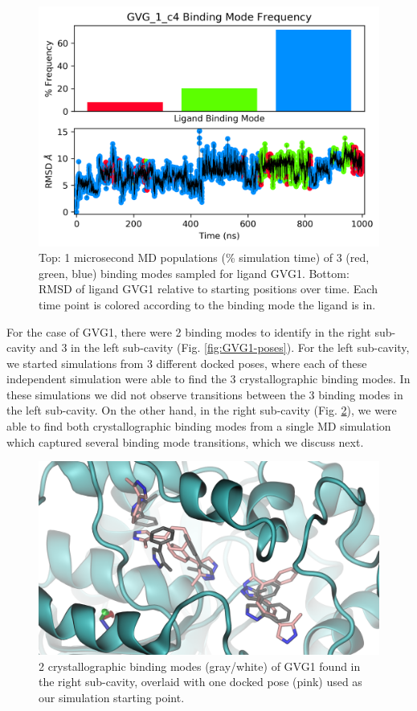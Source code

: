 \begin{figure}
    \centering
    \includegraphics[width=\linewidth]{chapter6/Figures/GVG_1_c4-md.png}
    \caption[GVG1 MD Populations]{Top: 1 microsecond MD populations (\% simulation time) of 3 (red, green, blue) binding modes sampled for ligand GVG1. Bottom: RMSD of ligand GVG1 relative to starting positions over time. Each time point is colored according to the binding mode the ligand is in.}
    \label{fig:GVG1_c4-md}
\end{figure}

For the case of GVG1, there were 2 binding modes to identify in the right sub-cavity and 3 in the left sub-cavity (Fig. \ref{fig:GVG1-poses}).
For the left sub-cavity, we started simulations from 3 different docked poses, where each of these independent simulation were able to find the 3 crystallographic binding modes.
In these simulations we did not observe transitions between the 3 binding modes in the left sub-cavity.
On the other hand, in the right sub-cavity (Fig. \ref{fig:GVG1-xtal}), we were able to find both crystallographic binding modes from a single MD simulation which captured several binding mode transitions, which we discuss next.

\begin{figure}
    \centering
    \includegraphics[width=\linewidth]{chapter6/Figures/GVG_1-poses.png}
    \caption[GVG1 crystallographic binding modes]{2 crystallographic binding modes (gray/white) of GVG1 found in the right sub-cavity, overlaid with one docked pose (pink) used as our simulation starting point.}
    \label{fig:GVG1-xtal}
\end{figure}

